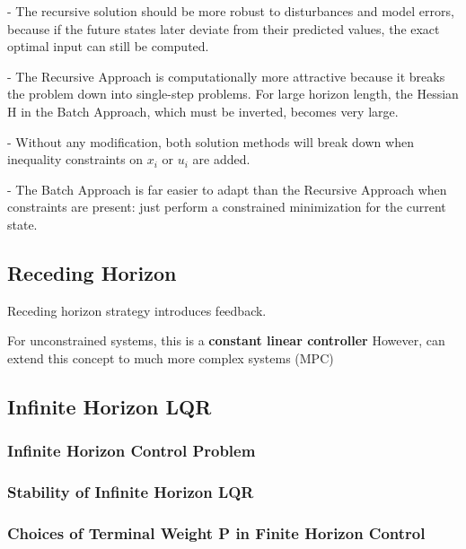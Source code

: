 - The recursive solution should be more robust to disturbances and model
errors, because if the future states later deviate from their predicted
values, the exact optimal input can still be computed.

- The Recursive Approach is computationally more attractive because it
breaks the problem down into single-step problems. For large horizon
length, the Hessian H in the Batch Approach, which must be inverted,
becomes very large.

- Without any modification, both solution methods will break down when
inequality constraints on $x_i$ or $u_i$ are added.

- The Batch Approach is far easier to adapt than the Recursive Approach
when constraints are present: just perform a constrained minimization for
the current state.

\subsection{Receding Horizon}

Receding horizon strategy introduces feedback.


For unconstrained systems, this is a \textbf{constant linear controller}
However, can extend this concept to much more complex systems (MPC)


\subsection{Infinite Horizon LQR}

\subsubsection{Infinite Horizon Control Problem}






\subsubsection{Stability of Infinite Horizon LQR}


\subsubsection{Choices of Terminal Weight P in Finite Horizon Control}

